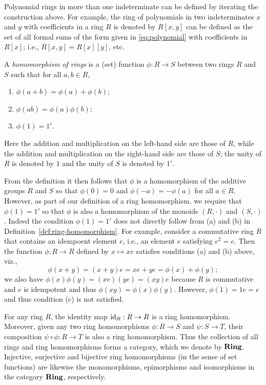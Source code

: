 \begin{example}
    Polynomial rings in more than one indeterminate can be defined by iterating
    the construction above. For example, the ring of polynomials in two
    indeterminates \(x\) and \(y\) with coefficients in a ring \(R\) is denoted
    by \(R[x, y]\) can be defined as the set of all formal sums of the form
    given in \eqref{eq:polynomial} with coefficients in \(R[x]\); i.e., \(R[x,
    y] = R[x][y]\), etc.
\end{example}

\begin{definition}
    \label{def:ring-homomorphism}
    A \emph{homomorphism of rings} is a (set) function \(\phi: R \to S\) between
    two rings \(R\) and \(S\) such that for all \(a, b \in R\),
    \begin{enumerate}[label=(\alph*)]
        \item \(\phi(a + b) = \phi(a) + \phi(b)\);
        \item \(\phi(ab) = \phi(a)\phi(b)\);
        \item \(\phi(1) = 1'\).
    \end{enumerate}
    Here the addition and multiplication on the left-hand side are those of
    \(R\), while the addition and multiplication on the right-hand side are
    those of \(S\); the unity of \(R\) is denoted by \(1\) and the unity of
    \(S\) is denoted by \(1'\).
\end{definition}

From the definition it then follows that \(\phi\) is a homomorphism of the
additive groups \(R\) and \(S\) so that \(\phi(0) = 0\) and \(\phi(-a) =
-\phi(a)\) for all \(a \in R\). However, as part of our definition of a ring
homomorphism, we require that \(\phi(1) = 1'\) so that \(\phi\) is also a
homomorphism of the monoids \((R, \cdot)\) and \((S, \cdot)\). Indeed the
condition \(\phi(1) = 1'\) does not directly follow from (a) and (b) in
Definition~\ref{def:ring-homomorphism}. For example, consider a commutative ring
\(R\) that contains an idempoent element \(e\), i.e., an element \(e\)
satisfying \(e^2 = e\). Then the function \(\phi: R \to R\) defined by \(x
\mapsto xe\) satisfies conditions (a) and (b) above, viz., \[\phi(x + y) = (x +
y)e = xe + ye = \phi(x) + \phi(y);\] we also have \(\phi(x) \phi(y) = (xe)(ye) =
(xy)e\) because \(R\) is commutative and \(e\) is idempotent and thus \(\phi(xy)
= \phi(x) \phi(y)\). However, \(\phi(1) = 1e = e\) and thus condition (c) is not
satisfied.

For any ring \(R\), the identity map \(\operatorname{id}_R: R \to R\) is a ring homomorphism.
Moreover, given any two ring homomorphisms \(\phi: R \to S\) and \(\psi: S \to
T\), their composition \(\psi \circ \phi: R \to T\) is also a ring homomorphism.
Thus the collection of all rings and ring homomorphisms forms a category, which
we denote by \(\mathbf{Ring}\). Injective, surjective and bijective ring homomorphisms
(in the sense of set functions) are likewise the monomorphisms, epimorphisms and
isomorphisms in the category \(\mathbf{Ring}\), respectively.

